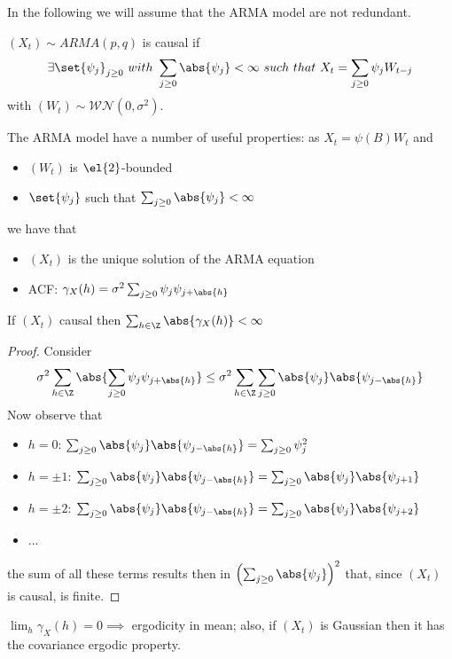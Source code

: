 In the following we will assume that the ARMA model are not redundant.

\begin{definition}
    $(X_t)\sim ARMA(p,q)$ is causal if
    \[
        \exists\set{\psi_j}_{j\ge0}\ with\ \sum_{j\ge0}\abs{\psi_j}<\infty\ such\ that\ X_t=\sum_{j\ge0}\psi_jW_{t-j}  
    \]
    with $(W_t)\sim\mathcal{WN}(0,\sigma^2)$.
\end{definition}

The ARMA model have a number of useful properties: as $X_t=\psi(B)W_t$ and
\begin{itemize}
    \item $(W_t)$ is $\el{2}$-bounded
    \item $\set{\psi_j}$ such that $\sum_{j\ge0}\abs{\psi_j}<\infty$
\end{itemize}
we have that
\begin{itemize}
    \item $(X_t)$ is the unique solution of the ARMA equation
    \item ACF: $\gamma_X(h)=\sigma^2\sum_{j\ge0}\psi_j\psi_{j+\abs{h}}$
\end{itemize}

\begin{proposition}
    If $(X_t)$ causal then $\sum_{h\in\Z}\abs{\gamma_X(h)}<\infty$
\end{proposition}

\begin{proof}
    Consider
    \[
        \sigma^2\sum_{h\in\Z}\abs{\sum_{j\ge0}\psi_j\psi_{j+\abs{h}}}\le\sigma^2\sum_{h\in\Z}\sum_{j\ge0}\abs{\psi_j}\abs{\psi_{j-\abs{h}}} 
    \]
    Now observe that
    \begin{itemize}
        \item $h=0$: $\sum_{j\ge0}\abs{\psi_j}\abs{\psi_{j-\abs{h}}}=\sum_{j\ge0}\psi_j^2$
        \item $h=\pm1$: $\sum_{j\ge0}\abs{\psi_j}\abs{\psi_{j-\abs{h}}}=\sum_{j\ge0}\abs{\psi_j}\abs{\psi_{j+1}}$
        \item $h=\pm2$: $\sum_{j\ge0}\abs{\psi_j}\abs{\psi_{j-\abs{h}}}=\sum_{j\ge0}\abs{\psi_j}\abs{\psi_{j+2}}$
        \item ...
    \end{itemize}
    the sum of all these terms results then in $\left(\sum_{j\ge0}\abs{\psi_j}\right)^2$ that, since $(X_t)$ is causal, is finite.
\end{proof}

\begin{corollary}
    $\lim_h\gamma_X(h)=0\implies$ ergodicity in mean; also, if $(X_t)$ is Gaussian then it has the covariance ergodic property.
\end{corollary}

